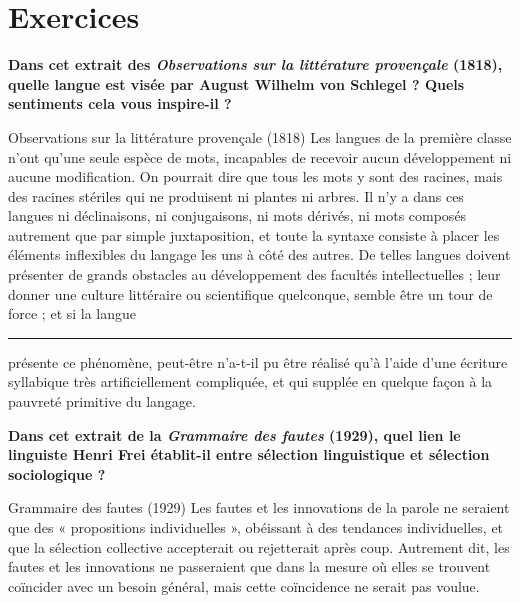 \section*{Exercices}
\begin{keybox}[I]
\textbf{Dans cet extrait des \textit{Observations sur la littérature provençale} (1818), quelle langue est visée par August Wilhelm von Schlegel ? Quels sentiments cela vous inspire-il ?}
\begin{lecture}{Observations sur la littérature provençale (1818)}
Les langues de la première classe n’ont qu’une seule espèce de mots, incapables de recevoir aucun développement ni aucune modification. On pourrait dire que tous les mots y sont des racines, mais des racines stériles qui ne produisent ni plantes ni arbres. Il n’y a dans ces langues ni déclinaisons, ni conjugaisons, ni mots dérivés, ni mots composés autrement que par simple juxtaposition, et toute la syntaxe consiste à placer les éléments inflexibles du langage les uns à côté des autres. De telles langues doivent présenter de grands obstacles au développement des facultés intellectuelles ; leur donner une culture littéraire ou scientifique quelconque, semble être un tour de force ; et si la langue \rule{2.8cm}{.4pt} présente ce phénomène, peut-être n’a-t-il pu être réalisé qu’à l’aide d’une écriture syllabique très artificiellement compliquée, et qui supplée en quelque façon à la pauvreté primitive du langage.
\end{lecture}
\end{keybox}

\begin{keybox}[II]
\textbf{Dans cet extrait de la \textit{Grammaire des fautes} (1929), quel lien le linguiste Henri Frei établit-il entre sélection linguistique et sélection sociologique ?}
\begin{lecture}{Grammaire des fautes (1929)}
Les fautes et les innovations de la parole ne seraient que des « propositions individuelles », obéissant à des tendances individuelles, et que la sélection collective accepterait ou rejetterait après coup. Autrement dit, les fautes et les innovations ne passeraient que dans la mesure où elles se trouvent coïncider avec un besoin général, mais cette coïncidence ne serait pas voulue.
\end{lecture}
\end{keybox}


